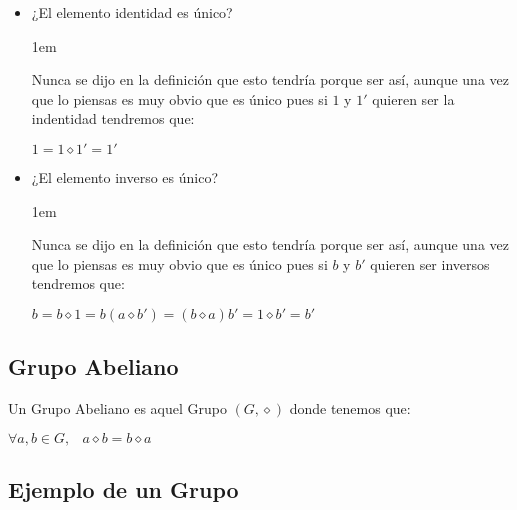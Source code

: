 \documentclass[12pt, fleqn]{report}                             %
\newenvironment{SmallIndentation}[1][0.75em]                    %
    {\begin{adjustwidth}{#1}{}\begin{footnotesize}}                 %
    {\end{footnotesize}\end{adjustwidth}}                           %
\DeclareMathOperator \Space {\quad}                             %
\DeclareMathOperator \MiniSpace {\;}                            %
\begin{document}
                \begin{itemize}
                    \item ¿El elemento identidad es único?

                    \begin{SmallIndentation}[1em]
                        Nunca se dijo en la definición que esto tendría porque ser
                        así, aunque una vez que lo piensas es muy obvio que es único
                        pues si $1$ y $1'$ quieren ser la indentidad tendremos que:

                        $1 = 1 \diamond 1' = 1'$
                    \end{SmallIndentation}

                    \item ¿El elemento inverso es único?

                    \begin{SmallIndentation}[1em]
                        Nunca se dijo en la definición que esto tendría porque ser
                        así, aunque una vez que lo piensas es muy obvio que es único
                        pues si $b$ y $b'$ quieren ser inversos tendremos que:

                        $b = b \diamond 1 = b (a \diamond b') = (b \diamond a) b' = 1 \diamond b' = b'$
                    \end{SmallIndentation}
                \end{itemize}




            \clearpage
            \subsection{Grupo Abeliano}

                Un Grupo Abeliano es aquel Grupo $(G, \diamond)$ donde tenemos que:

                $\forall a, b \in G, \MiniSpace a \diamond b = b \diamond a$


            \subsection{Ejemplo de un Grupo}
\end{document}
